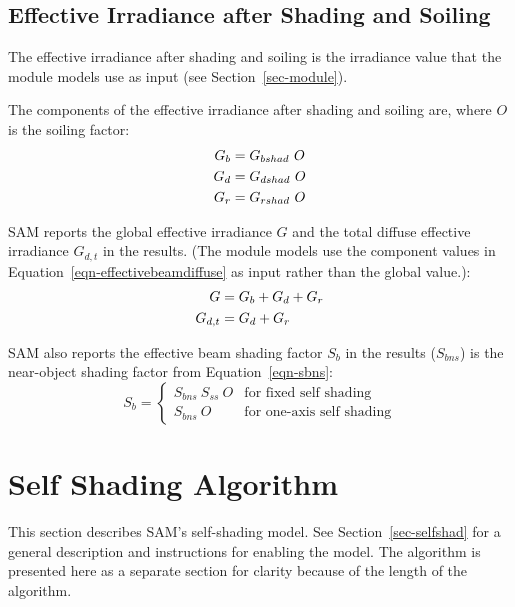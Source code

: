 \documentclass[12pt,letterpaper]{article}
\begin{document}
\section{Effective Irradiance after Shading and Soiling}

The effective irradiance after shading and soiling is the irradiance value that the module models use as input (see Section~\ref{sec-module}).

The components of the effective irradiance after shading and soiling are, where $O$ is the soiling factor:
\begin{align} \label{eqn-effectivebeamdiffuse}
G_b &= G_{bshad}~O \notag\\
G_d &= G_{dshad}~O\notag\\
G_r &=  G_{rshad}~O
\end{align}

SAM reports the global effective irradiance $G$ and the total diffuse effective irradiance $G_{d,t}$ in the results. (The module models use the component values in Equation~\ref{eqn-effectivebeamdiffuse} as input rather than the global value.):
\begin{align}
G &= G_b + G_d + G_r\notag\\
G_{d,t} & = G_d + G_r
\end{align}

SAM also reports the effective beam shading factor $S_b$ in the results ($S_{bns}$) is the near-object shading factor from Equation~\ref{eqn-sbns}:
\begin{equation}
S_b = \left\{
\begin{array}{ll}
S_{bns}~S_{ss}~O &\text{for fixed self shading}\\
S_{bns}~O &\text{for one-axis self shading} 
\end{array}
\right.
\end{equation}

\chapter{Self Shading Algorithm}\label{sec-selfshadalg}

This section describes SAM's self-shading model. See Section~\ref{sec-selfshad} for a general description and instructions for enabling the model. The algorithm is presented here as a separate section for clarity because of the length of the algorithm.
\end{document}

